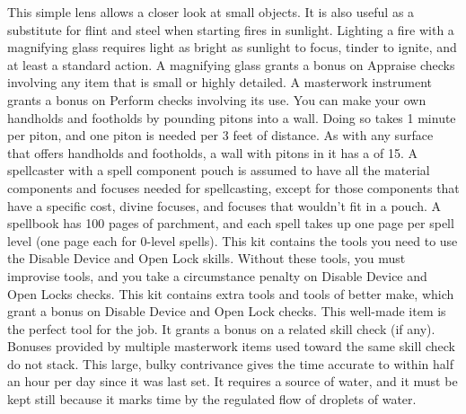          This simple lens allows a closer look at small objects. It is also useful as a substitute for flint and steel when starting fires in sunlight. Lighting a fire with a magnifying glass requires light as bright as sunlight to focus, tinder to ignite, and at least a standard action.
        A magnifying glass grants a  bonus on Appraise checks involving any item that is small or highly detailed.
         A masterwork instrument grants a  bonus on Perform checks involving its use.
         You can make your own handholds and footholds by pounding pitons into a wall. Doing so takes 1 minute per piton, and one piton is needed per 3 feet of distance. As with any surface that offers handholds and footholds, a wall with pitons in it has a  of 15.
         A spellcaster with a spell component pouch is assumed to have all the material components and focuses needed for spellcasting, except for those components that have a specific cost, divine focuses, and focuses that wouldn't fit in a pouch.
         A spellbook has 100 pages of parchment, and each spell takes up one page per spell level (one page each for 0-level spells).
         This kit contains the tools you need to use the Disable Device and Open Lock skills. Without these tools, you must improvise tools, and you take a  circumstance penalty on Disable Device and Open Locks checks.
         This kit contains extra tools and tools of better make, which grant a  bonus on Disable Device and Open Lock checks.
         This well-made item is the perfect tool for the job. It grants a  bonus on a related skill check (if any). Bonuses provided by multiple masterwork items used toward the same skill check do not stack.
         This large, bulky contrivance gives the time accurate to within half an hour per day since it was last set. It requires a source of water, and it must be kept still because it marks time by the regulated flow of droplets of water.

